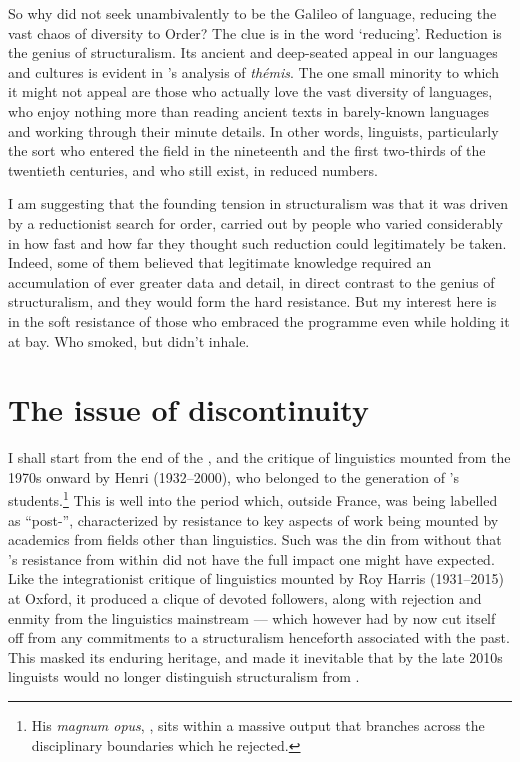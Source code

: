\documentclass[output=paper]{langscibook}
\begin{document}
So why did {\Benveniste} not seek unambivalently to be the Galileo of language, reducing the vast chaos of diversity to Order? The clue is in the word ‘reducing’. Reduction is the genius of structuralism. Its ancient and deep-seated appeal in our languages and cultures is evident in {\Benveniste}'s analysis of \emph{thémis}. The one small minority to which it might not appeal are those who actually love the vast diversity of languages, who enjoy nothing more than reading ancient texts in barely-known languages and working through their minute details. In other words, linguists, particularly the sort who entered the field in the nineteenth and the first two-thirds of the twentieth centuries, and who still exist, in reduced numbers.

I am suggesting that the founding tension in structuralism was that it was driven by a reductionist search for order, carried out by people who varied considerably in how fast and how far they thought such reduction could legitimately be taken. Indeed, some of them believed that legitimate knowledge required an accumulation of ever greater data and detail, in direct contrast to the genius of structuralism, and they would form the hard resistance. But my interest here is in the soft resistance of those who embraced the programme even while holding it at bay. Who smoked, but didn’t inhale.

\section{The issue of discontinuity}
\label{sec:joseph:discontinuity}

I shall start from the end of the , and the critique of  linguistics mounted from the 1970s onward by Henri {\Meschonnic} (1932--2000), who belonged to the generation of {\Benveniste}'s students.\footnote{His \emph{magnum opus}, \citet{Meschonnic1982}, sits within a massive output that branches across the disciplinary boundaries which he rejected.}  This is well into the period which, outside France, was being labelled as ``post-'', characterized by resistance to key aspects of  work being mounted by academics from fields other than linguistics. Such was the din from without that {\Meschonnic}'s resistance from within did not have the full impact one might have expected. Like the integrationist critique of linguistics mounted by Roy Harris (1931--2015) at Oxford, it produced a clique of devoted followers, along with rejection and enmity from the linguistics mainstream — which however had by now cut itself off from any commitments to a structuralism henceforth associated with the past. This masked its enduring heritage, and made it inevitable that by the late 2010s linguists would no longer distinguish structuralism from .
\end{document}
